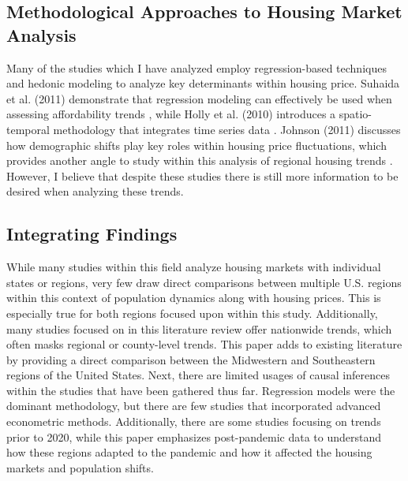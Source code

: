 \documentclass[journal,article,submit,pdftex,moreauthors]{Definitions/mdpi}
\begin{document}
\subsection{Methodological Approaches to Housing Market Analysis}

Many of the studies which I have analyzed employ regression-based techniques and hedonic modeling to analyze key determinants within housing price. Suhaida et al. (2011) demonstrate that regression modeling can effectively be used when assessing affordability trends \citep{suhaida_2011_housing}, while Holly et al. (2010) introduces a spatio-temporal methodology that integrates time series data \citep{holly_2010_a}. Johnson (2011) discusses how demographic shifts play key roles within housing price fluctuations, which provides another angle to study within this analysis of regional housing trends \citep{johnson_2019_rural}. However, I believe that despite these studies there is still more information to be desired when analyzing these trends.

\subsection{Integrating Findings}

While many studies within this field analyze housing markets with individual states or regions, very few draw direct comparisons between multiple U.S. regions within this context of population dynamics along with housing prices. This is especially true for both regions focused upon within this study. Additionally, many studies focused on in this literature review offer nationwide trends, which often masks regional or county-level trends. This paper adds to existing literature by providing a direct comparison between the Midwestern and Southeastern regions of the United States. Next, there are limited usages of causal inferences within the studies that have been gathered thus far. Regression models were the dominant methodology, but there are few studies that incorporated advanced econometric methods. Additionally, there are some studies focusing on trends prior to 2020, while this paper emphasizes post-pandemic data to understand how these regions adapted to the pandemic and how it affected the housing markets and population shifts.
\end{document}
